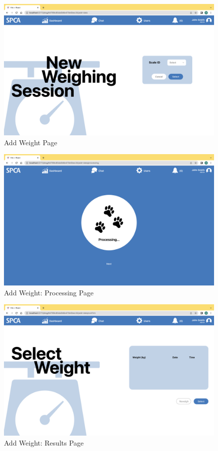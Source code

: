 \begin{figure}[h]
\centering
\includegraphics[width=\textwidth]{final-report/assets/web_add_weight.png}
\caption{Add Weight Page}
\end{figure}

\begin{figure}[h]
\centering
\includegraphics[width=\textwidth]{final-report/assets/web_add_weight_processing.png}
\caption{Add Weight: Processing Page}
\end{figure}

\begin{figure}[h]
\centering
\includegraphics[width=\textwidth]{final-report/assets/web_select_weight.png}
\caption{Add Weight: Results Page}
\end{figure}

